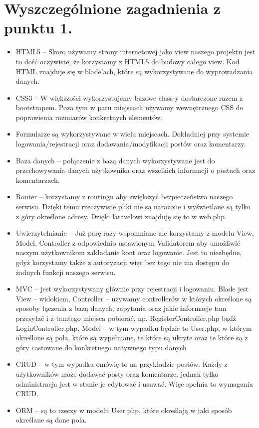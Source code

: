 \documentclass{article}
\begin{document}
\section{Wyszczególnione zagadnienia z punktu 1.}
\begin{itemize}
  \item HTML5 – Skoro używamy strony internetowej jako view naszego projektu jest to dość oczywiste, że korzystamy z HTML5 do budowy całego view. Kod HTML znajduje się w blade’ach, które są wykorzystywane do wyprowadzania danych.
  \item CSS3 – W większości wykorzystujemy bazowe class-y dostarczone razem z bootstrapem. Poza tym w paru miejscach używamy wewnętrznego CSS do poprawienia rozmiarów konkretnych elementów.
\item Formularze są wykorzystywane w wielu miejscach. Dokładniej przy systemie logowania/rejestracji oraz dodawania/modyfikacji postów oraz komentarzy.
\item Baza danych – połączenie z bazą danych wykorzystywane jest do przechowywania danych użytkownika oraz wszelkich informacji o postach oraz komentarzach.
\item Router – korzystamy z routingu aby zwiększyć bezpieczeństwo naszego serwisu. Dzięki temu rzeczywiste pliki nie są narażone i wyświetlane są tylko z góry określone adresy. Dzięki laravelowi znajduję się to w web.php.
\item Uwierzytelnianie – Już parę razy wspomniane ale korzystamy z modelu View, Model, Controller z odpowiednio ustawionym Validatorem aby umożliwić naszym użytkownikom zakładanie kont oraz logowanie. Jest to niezbędne, gdyż korzystamy także z autoryzacji więc bez tego nie ma dostępu do żadnych funkcji naszego serwisu.
\item MVC – jest wykorzystywany głównie przy rejestracji i logowaniu. Blade jest View – widokiem, Controller – używamy controllerów w których określone są sposoby łączenia z bazą danych, zapytania oraz jakie informacje tam przesyłać i z tamtego miejsca pobierać, np. RegisterController.php bądź LoginController.php, Model – w tym wypadku będzie to User.php, w którym określone są pola, które są wypełniane, te które są ukryte oraz te które są z góry castowane do konkretnego natywnego typu danych
\item CRUD – w tym wypadku omówię to na przykładzie postów. Każdy z użytkowników może dodawać posty oraz komentarze, jednak tylko administracja jest w stanie je edytować i usuwać. Więc spełnia to wymagania CRUD.
\item ORM – są to rzeczy w modelu User.php, które określają w jaki sposób określane są dane pola.

\end{itemize}
\end{document}

